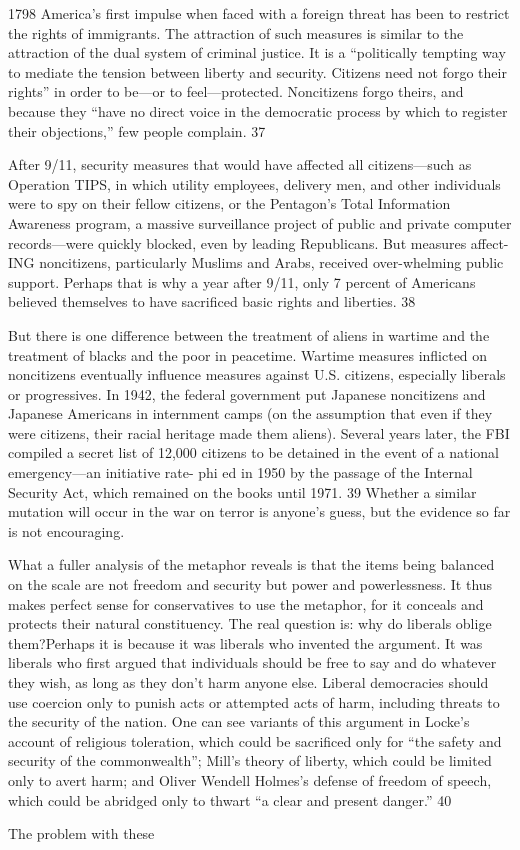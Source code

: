 1798 America’s first impulse when faced with a foreign threat has been to restrict the rights of immigrants. The attraction of such measures is similar to the attraction of the dual system of criminal justice. It is a “politically tempting way to mediate the tension between liberty and security. Citizens need not forgo their rights” in order to be—or to feel—protected. Noncitizens forgo theirs, and because they “have no direct voice in the democratic process by which to register their objections,” few people complain. {\color{blue} 37 } {\par} After 9/11, security measures that would have affected all citizens—such as Operation TIPS, in which utility employees, delivery men, and other individuals were to spy on their fellow citizens, or the Pentagon’s Total Information Awareness program, a massive surveillance project of public and private computer records—were quickly blocked, even by leading Republicans. But measures affect- ING noncitizens, particularly Muslims and Arabs, received over-whelming public support. Perhaps that is why a year after 9/11, only {\color{blue} 7 } percent of Americans believed themselves to have sacrificed basic rights and liberties. {\color{blue} 38 } {\par} But there is one difference between the treatment of aliens in wartime and the treatment of blacks and the poor in peacetime. Wartime measures inflicted on noncitizens eventually influence measures against U.S. citizens, especially liberals or progressives. In 1942, the federal government put Japanese noncitizens and Japanese Americans in internment camps (on the assumption that even if they were citizens, their racial heritage made them aliens). Several years later, the FBI compiled a secret list of 12,000 citizens to be detained in the event of a national emergency—an initiative rate- phi ed in 1950 by the passage of the Internal Security Act, which remained on the books until 1971. {\color{blue} 39 } Whether a similar mutation will occur in the war on terror is anyone’s guess, but the evidence so far is not encouraging.{\par} What a fuller analysis of the metaphor reveals is that the items being balanced on the scale are not freedom and security but power and powerlessness. It thus makes perfect sense for conservatives to use the metaphor, for it conceals and protects their natural constituency. The real question is: why do liberals oblige them?Perhaps it is because it was liberals who invented the argument. It was liberals who first argued that individuals should be free to say and do whatever they wish, as long as they don’t harm anyone else. Liberal democracies should use coercion only to punish acts or attempted acts of harm, including threats to the security of the nation. One can see variants of this argument in Locke’s account of religious toleration, which could be sacrificed only for “the safety and security of the commonwealth”; Mill’s theory of liberty, which could be limited only to avert harm; and Oliver Wendell Holmes’s defense of freedom of speech, which could be abridged only to thwart “a clear and present danger.” {\color{blue} 40 } {\par} The problem with these 